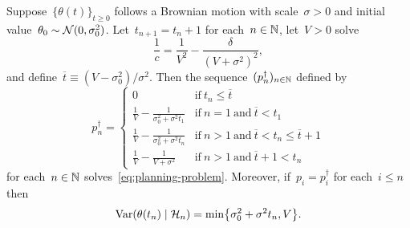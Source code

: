 \documentclass[11pt,oneside]{article}
\begin{document}
\begin{proposition}
    \label{prop:planning-solution}
    Suppose~$\{\theta(t)\}_{t\ge0}$ follows a Brownian motion with scale~$\sigma>0$ and initial value~$\theta_0\sim\mathcal{N}(0,\sigma_0^2)$.
    Let~$t_{n+1}=t_n+1$ for each~$n\in\mathbb{N}$, let~$V>0$ solve
    \begin{equation}
        \frac{1}{c}=\frac{1}{V^2}-\frac{\delta}{(V+\sigma^2)^2}, \label{eq:planning-V}
    \end{equation}
    and define~$\overline{t}\equiv(V-\sigma_0^2)/\sigma^2$.
    Then the sequence~$(p_n^\dag)_{n\in\mathbb{N}}$ defined by
    \[ p_n^\dag=\begin{cases}
        0 & \text{if}\ t_n\le\overline{t} \\
        \frac{1}{V}-\frac{1}{\sigma_0^2+\sigma^2t_1} & \text{if}\ n=1\ \text{and}\ \overline{t}<t_1 \\
        \frac{1}{V}-\frac{1}{\sigma_0^2+\sigma^2t_n} & \text{if}\ n>1\ \text{and}\ \overline{t}<t_n\le\overline{t}+1 \\
        \frac{1}{V}-\frac{1}{V+\sigma^2} & \text{if}\ n>1\ \text{and}\ \overline{t}+1<t_n
    \end{cases} \]
    for each~$n\in\mathbb{N}$ solves~\eqref{eq:planning-problem}.
    Moreover, if~$p_i=p_i^\dag$ for each~$i\le n$ then
    \[ \Var(\theta(t_n)\mid\Hcal_n)=\min\left\{\sigma_0^2+\sigma^2t_n,V\right\}. \]
\end{proposition}
%
\end{document}
